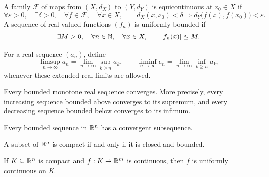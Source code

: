     \begin{definition}
        A family $\mathcal{F}$ of maps from $(X,d_X)$ to $(Y,d_Y)$ is
        equicontinuous at $x_0\in X$ if
        \[
            \forall\varepsilon>0,
            \quad
            \exists\delta>0,
            \quad
            \forall f\in\mathcal{F},
            \quad
            \forall x\in X,
            \qquad
            d_X(x,x_0)<\delta
            \Rightarrow
            d_Y\bigl(f(x),f(x_0)\bigr)<\varepsilon.
        \]
        A sequence of real-valued functions $(f_n)$ is uniformly bounded if
        \[
            \exists M>0,
            \quad
            \forall n\in\mathbb{N},
            \quad
            \forall x\in X,
            \qquad
            |f_n(x)|\leq M.
        \]
    \end{definition}

    \begin{definition}
        For a real sequence $(a_n)$, define
        \[
            \limsup_{n\to\infty} a_n
            =
            \lim\limits_{n\to\infty}\sup_{k\geq n} a_k,
            \qquad
            \liminf_{n\to\infty} a_n
            =
            \lim\limits_{n\to\infty}\inf_{k\geq n} a_k,
        \]
        whenever these extended real limits are allowed.
    \end{definition}

    \begin{theorem}
        Every bounded monotone real sequence converges. More precisely, every
        increasing sequence bounded above converges to its supremum, and every
        decreasing sequence bounded below converges to its infimum.
    \end{theorem}

    \begin{theorem}
        Every bounded sequence in $\mathbb{R}^n$ has a convergent subsequence.
    \end{theorem}

    \begin{theorem}
        A subset of $\mathbb{R}^n$ is compact if and only if it is closed and bounded.
    \end{theorem}

    \begin{theorem}
        If $K\subseteq\mathbb{R}^n$ is compact and $f:K\to\mathbb{R}^m$ is continuous, then $f$
        is uniformly continuous on $K$.
    \end{theorem}

